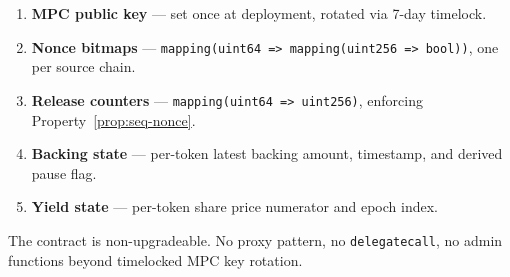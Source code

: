 \begin{enumerate}[nosep]
  \item \textbf{MPC public key} --- set once at deployment, rotated via 7-day timelock.
  \item \textbf{Nonce bitmaps} --- \texttt{mapping(uint64 => mapping(uint256 => bool))}, one per source chain.
  \item \textbf{Release counters} --- \texttt{mapping(uint64 => uint256)}, enforcing Property~\ref{prop:seq-nonce}.
  \item \textbf{Backing state} --- per-token latest backing amount, timestamp, and derived pause flag.
  \item \textbf{Yield state} --- per-token share price numerator and epoch index.
\end{enumerate}

The contract is non-upgradeable. No proxy pattern, no \texttt{delegatecall}, no admin functions beyond timelocked MPC key rotation.

